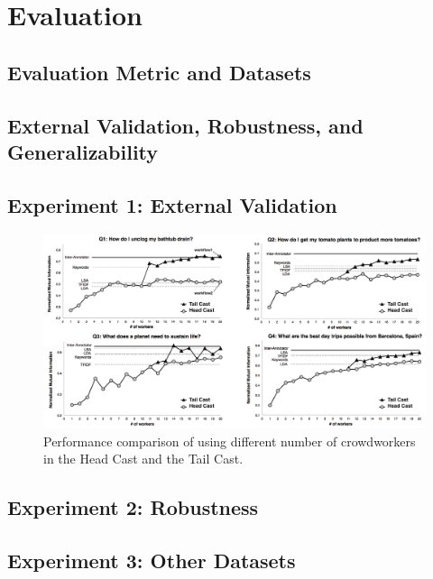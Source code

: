 \section{Evaluation}

\subsection{Evaluation Metric and Datasets}



\subsection{External Validation, Robustness, and Generalizability}


\subsection{Experiment 1: External Validation}


\begin{figure}
	\centering
	\includegraphics[width=1\columnwidth]{Chapters/Alloy/images/numberOfTurkers.png}
	\caption[Performance comparison of using different number of crowdworkers.]{Performance comparison of using different number of crowdworkers in the Head Cast and the Tail Cast.}
	\label{fig:numberOfTurkers}
\end{figure}


\subsection{Experiment 2: Robustness}

\subsection{Experiment 3: Other Datasets}


